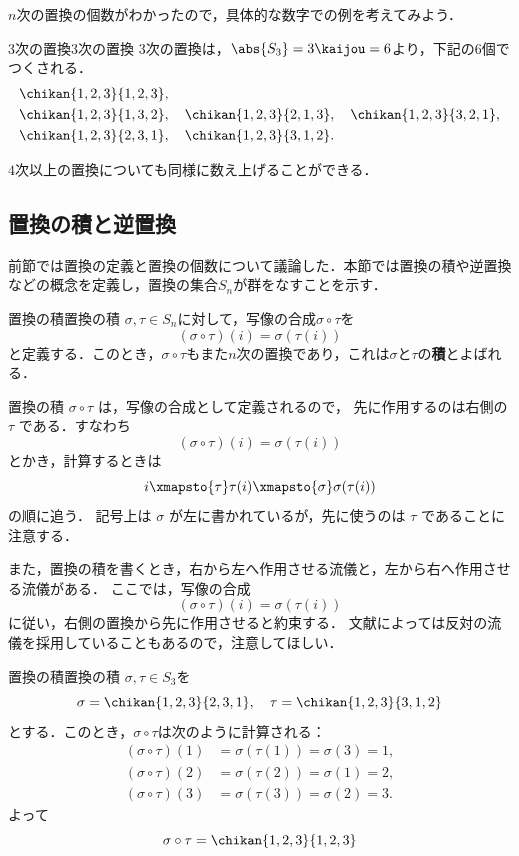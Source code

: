 $n$次の置換の個数がわかったので，具体的な数字での例を考えてみよう．

\begin{example}{3次の置換}{3次の置換}
  3次の置換は，$\abs{S_3} = 3\kaijou = 6$より，下記の$6$個でつくされる．
  \begin{align*}
    &\chikan{1, 2, 3}{1, 2, 3}, \\
    &\chikan{1, 2, 3}{1, 3, 2}, \quad
    \chikan{1, 2, 3}{2, 1, 3},\quad 
    \chikan{1, 2, 3}{3, 2, 1}, \\
    &\chikan{1, 2, 3}{2, 3, 1},\quad 
    \chikan{1, 2, 3}{3, 1, 2}.
  \end{align*}
\end{example}

$4$次以上の置換についても同様に数え上げることができる．

\subsection{置換の積と逆置換}

前節では置換の定義と置換の個数について議論した．本節では置換の積や逆置換などの概念を定義し，置換の集合$S_n$が群をなすことを示す．

\begin{definition}{置換の積}{置換の積}
  $\sigma, \tau \in S_n$に対して，写像の合成$\sigma \circ \tau$を
  \[
  (\sigma \circ \tau)(i) = \sigma(\tau(i))
  \]
  と定義する．このとき，$\sigma \circ \tau$もまた$n$次の置換であり，これは$\sigma$と$\tau$の\textbf{積}とよばれる．
\end{definition}

置換の積 $\sigma \circ \tau$ は，写像の合成として定義されるので，
先に作用するのは右側の $\tau$ である．すなわち
\[
(\sigma\circ\tau)(i)=\sigma(\tau(i))
\]
とかき，計算するときは
\[
i \xmapsto{\tau} \tau(i) \xmapsto{\sigma} \sigma(\tau(i))
\]
の順に追う．
記号上は $\sigma$ が左に書かれているが，先に使うのは $\tau$ であることに注意する．


また，置換の積を書くとき，右から左へ作用させる流儀と，左から右へ作用させる流儀がある．
ここでは，写像の合成
\[
(\sigma\circ\tau)(i)=\sigma(\tau(i))
\]
に従い，右側の置換から先に作用させると約束する．
文献によっては反対の流儀を採用していることもあるので，注意してほしい．

\begin{example}{置換の積}{置換の積}
  $\sigma, \tau \in S_3$を
  \[
  \sigma = \chikan{1, 2, 3}{2, 3, 1}, \quad
  \tau = \chikan{1, 2, 3}{3, 1, 2}
  \]
  とする．このとき，$\sigma \circ \tau$は次のように計算される：
  \begin{align*}
    (\sigma \circ \tau)(1) &= \sigma(\tau(1)) = \sigma(3) = 1, \\
    (\sigma \circ \tau)(2) &= \sigma(\tau(2)) = \sigma(1) = 2, \\
    (\sigma \circ \tau)(3) &= \sigma(\tau(3)) = \sigma(2) = 3.
  \end{align*}
  よって
  \[
  \sigma \circ \tau = \chikan{1, 2, 3}{1, 2, 3}
  \]
\end{example}



